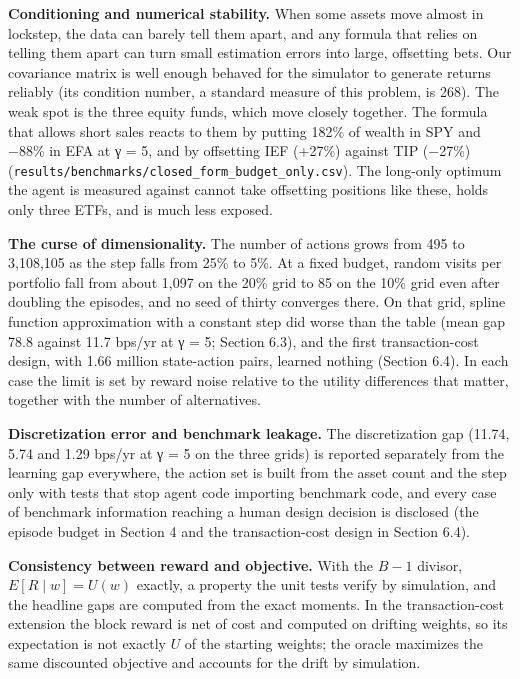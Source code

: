 \documentclass[
  11pt]{article}
\begin{document}
\textbf{Conditioning and numerical stability.} When some assets move
almost in lockstep, the data can barely tell them apart, and any formula
that relies on telling them apart can turn small estimation errors into
large, offsetting bets. Our covariance matrix is well enough behaved for
the simulator to generate returns reliably (its condition number, a
standard measure of this problem, is 268). The weak spot is the three
equity funds, which move closely together. The formula that allows short
sales reacts to them by putting 182\% of wealth in SPY and −88\% in EFA
at γ = 5, and by offsetting IEF (+27\%) against TIP (−27\%)
(\texttt{results/benchmarks/closed\_form\_budget\_only.csv}). The
long-only optimum the agent is measured against cannot take offsetting
positions like these, holds only three ETFs, and is much less exposed.

\textbf{The curse of dimensionality.} The number of actions grows from
495 to 3,108,105 as the step falls from 25\% to 5\%. At a fixed budget,
random visits per portfolio fall from about 1,097 on the 20\% grid to 85
on the 10\% grid even after doubling the episodes, and no seed of thirty
converges there. On that grid, spline function approximation with a
constant step did worse than the table (mean gap 78.8 against 11.7
bps/yr at γ = 5; Section 6.3), and the first transaction-cost design,
with 1.66 million state-action pairs, learned nothing (Section 6.4). In
each case the limit is set by reward noise relative to the utility
differences that matter, together with the number of alternatives.

\textbf{Discretization error and benchmark leakage.} The discretization
gap (11.74, 5.74 and 1.29 bps/yr at γ = 5 on the three grids) is
reported separately from the learning gap everywhere, the action set is
built from the asset count and the step only with tests that stop agent
code importing benchmark code, and every case of benchmark information
reaching a human design decision is disclosed (the episode budget in
Section 4 and the transaction-cost design in Section 6.4).

\textbf{Consistency between reward and objective.} With the \(B-1\)
divisor, \(E[R \mid w] = U(w)\) exactly, a property the unit tests
verify by simulation, and the headline gaps are computed from the exact
moments. In the transaction-cost extension the block reward is net of
cost and computed on drifting weights, so its expectation is not exactly
\(U\) of the starting weights; the oracle maximizes the same discounted
objective and accounts for the drift by simulation.
\end{document}
